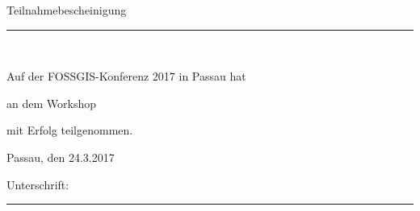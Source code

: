 \documentclass[a4paper, 12pt]{letter}
\begin{document}
{  \begin{center}

    \vspace*{4mm}
    \Huge Teilnahmebescheinigung
    \noindent\rule{0.9\textwidth}{1pt}\\
    
    \vspace*{14mm}
    
    \large
    
    Auf der FOSSGIS-Konferenz 2017 in Passau hat\\
    
    \vspace*{5mm}
    
    \Huge
    \person
    
    \vspace*{5mm}
    
    \large
    an dem Workshop
    
    \vspace*{5mm}

    \begin{minipage}{0.7\textwidth}
      \centering\bf\produkt
    \end{minipage}

    \vspace*{5mm}
    
    mit Erfolg teilgenommen.
    
  \end{center}


  \vspace*{18mm}

  \large
  \hskip 1cm Passau, den 24.3.2017
  
  \vspace*{12mm}
  
  \hskip 1cm Unterschrift: \rule{0.5\textwidth}{0.5pt}
  
  \newpage
} 
\end{document}
